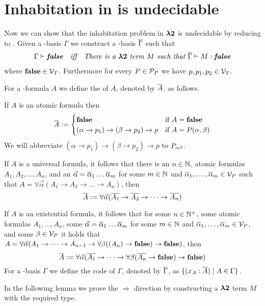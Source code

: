 \section{Inhabitation in \lambdaTwo{} is undecidable}\label{sec.4}
Now we can show that the inhabitation problem in $\boldsymbol{\lambda2}$ %
is undecidable by reducing \PCons{} to \lambdaInhab{}. Given a \SysP-basis $\Gamma$ we construct a \lambdaTwo-basis $\overline{\Gamma}$ such that 
\begin{align*}
\textit{$\Gamma\vdash\textbf{false}$}&&\textit{iff}&&\textit{There is a $\boldsymbol{\lambda2}$ term $M$ such that  $\overline{\Gamma}\vdash M:\textbf{false}$}
\end{align*}
where $\textbf{false}\in\mathcal{V}_T$. Furthermore for every $P\in\mathcal{P}_P$ we have $p,p_1,p_2\in\mathcal{V}_T$. 

\begin{definition}\label{def.4.1}
For a \SysP-formula $A$ we define the  of $A$, denoted by $\overline{A}$, as follows.

If $A$ is an atomic formula then
\[
\overline{A}:=
\begin{cases}
\textbf{false} &\text{if $A=\textbf{false}$}\\
(\alpha\to p_1)\to(\beta\to p_2)\to p &\text{if $A=P(\alpha,\beta)$} 
\end{cases}
\]
We will abbreviate $(\alpha\to p_1)\to(\beta\to p_2)\to p$ to $P_{\alpha\beta}$.

If $A$ is a universal formula, it follows that there is an $n\in\mathbb{N}$, atomic formulas $A_1,A_2,\dots,A_n$, and an $\predVec=\predVec[1]\dots\predVec[m]$ for some $m\in\mathbb{N}$ and $\predVec[1],\dots,\predVec[m]\in\VarP$ such that $A=\forall\vec{\alpha}(A_1\to A_2 \to\dots\to A_n)$, then 
\[\trans{A}:=\forall\predVec(\trans{A_1}\to \trans{A_2} \to\dots\to\trans{ A_n})\]

If $A$ is an existential formula, it follows that for some $n\in\mathbb{N}^+$, some atomic formulas $A_1,\dots,A_n$, some $\predVec=\predVec[1]\dots\predVec[m]$ for some $m\in\mathbb{N}$ and $\predVec[1],\dots,\predVec[m]\in\VarP$, and some $\beta\in\mathcal{V}_P$ it holds that $A=\forall\vec{\alpha}(A_1 \to\dots\to A_{n-1}\to \forall\beta((A_n)\to\textbf{false})\to\textbf{false})$, then
\[\trans{A}:=\forall\predVec(\trans{A_1}\to\dots\to\forall\beta(\trans{ A_n}\to\false)\to\false)\]
For a \SysP-basis $\Gamma$ we define the code of $\Gamma$, denoted by $\overline{\Gamma}$, as $\{(x_A:\overline{A})\mid A\in\Gamma\}$.
\end{definition}

In the following lemma we prove the $\Rightarrow$ direction by constructing a $\boldsymbol{\lambda2}$ term $M$ with the required type.

